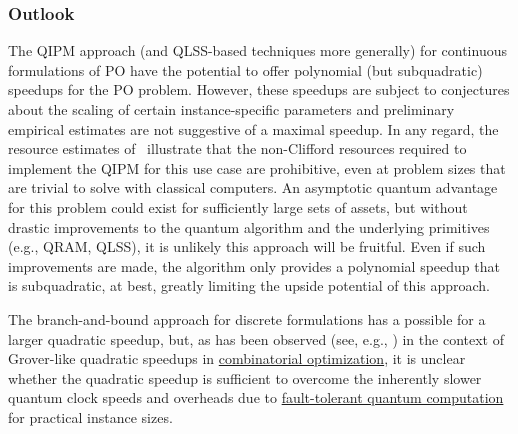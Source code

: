 \begin{refsection}
\subsubsection*{Outlook}

The QIPM approach (and QLSS-based techniques more generally) for continuous formulations of PO have the potential to offer polynomial (but subquadratic) speedups for the PO problem.  However, these speedups are subject to conjectures about the scaling of certain instance-specific parameters and preliminary empirical estimates are not suggestive of a maximal speedup. In any regard, the resource estimates of~\cite{dalzell2022socp} illustrate that the non-Clifford resources required to implement the QIPM for this use case are prohibitive, even at problem sizes that are trivial to solve with classical computers. An asymptotic quantum advantage for this problem could exist for sufficiently large sets of assets, but without drastic improvements to the quantum algorithm and the underlying primitives (e.g., QRAM, QLSS), it is unlikely this approach will be fruitful. Even if such improvements are made, the algorithm only provides a polynomial speedup that is subquadratic, at best, greatly limiting the upside potential of this approach. 

The branch-and-bound approach for discrete formulations has a possible for a larger quadratic speedup, but, as has been observed (see, e.g., \cite{campbell2019ApplyingQToCSPs,babbush2021FocusBeyondQuadratic}) in the context of Grover-like quadratic speedups in \hyperref[appl:SearchAlgorithms]{combinatorial optimization}, it is unclear whether the quadratic speedup is sufficient to overcome the inherently slower quantum clock speeds and  overheads due to \hyperref[prim:FTQC]{fault-tolerant quantum computation} for practical instance sizes. 


\printbibliography[heading=secbib,segment=\therefsegment]

\end{refsection}

\newpage 

